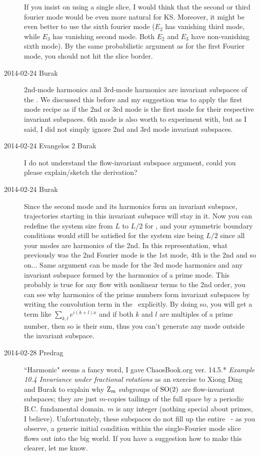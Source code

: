 \begin{description}
If you insist on using a single slice, I would think that the second or third fourier mode would be even more
natural for KS. Moreover, it might be even better to use the sixth fourier mode ($E_2$ has vanishing
third mode, while $E_3$ has vanishing second mode. Both $E_2$ and $E_3$ have non-vanishing sixth mode).
By the same probabilistic argument as for the first Fourier mode, you should not hit the slice border.

\item[2014-02-24 Burak] 2nd-mode harmonics and 3rd-mode harmonics are invariant
subspaces of the \KS . We discussed this before and my suggestion was to apply
the first mode recipe as if the 2nd or 3rd mode is the first mode for their
respective invariant subspaces. 6th mode is also worth to experiment with,
but as I said, I did not simply ignore 2nd and 3rd mode invariant subspaces.

\item[2014-02-24 Evangelos 2 Burak] I do not understand the flow-invariant subspace argument, could you
please explain/sketch the derivation?

\item[2014-02-24 Burak] Since the second mode and its harmonics form an
invariant subspace, trajectories starting in this invariant subspace will
stay in it. Now you can redefine the system size from $L$ to $L/2$ for \KS ,
and your symmetric boundary conditions would still be satisfied for the
system size being $L/2$ since all your modes are harmonics of the 2nd. In
this representation, what previously was the 2nd Fourier mode is the 1st
mode, 4th is the 2nd and so on... Same argument can be made for the 3rd mode
harmonics and any invariant subspace formed by the harmonics of a prime mode.
This probably is true for any flow with nonlinear terms to the 2nd order,
you can see why harmonics of the prime numbers form invariant subspaces by
writing the convolution term in the \KSe\ explicitly. By doing so, you will
get a term like $\sum_{k,l} e^{i (k+l) x}$ and if both $k$ and $l$ are multiples
of a prime number, then so is their sum, thus you can't generate any mode
outside the invariant subspace.

\item[2014-02-28 Predrag] ``Harmonic" seems a fancy word, I gave
ChaosBook.org ver. 14.5.*
{\em Example 10.4 Invariance under fractional rotations} as an exercise
to Xiong Ding and Burak to explain why $\textrm{Z}_{m}$ subgroups of $\textrm{SO}(2)$
are flow-invariant subspaces; they are just $m$-copies tailings of the full
space by a periodic B.C.
fundamental domain. $m$ is any integer (nothing special about primes, I believe).
Unfortunately, these subspaces do not fill up the entire \chartBord\ - as you observe,
a generic initial condition within the single-Fourier mode slice flows out
into the big world.
If you have a suggestion how to make this clearer, let me know.



\end{description}
